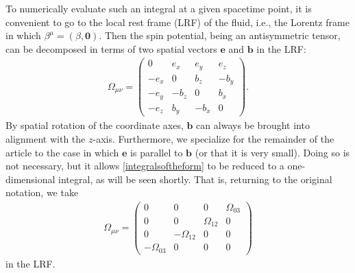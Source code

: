 \documentclass[12pt,aps,prd,nofootinbib,noshowkeys,noshowpacs,longbibliography,
superscriptaddress,tightenlines,floatfix,preprintnumbers]{revtex4-2}
\begin{document}
To numerically evaluate such an integral at a given spacetime point, it is convenient to go to the local rest frame (LRF) of the fluid, i.e., the Lorentz frame in which $\beta^\mu=(\beta, \bm 0)$. Then the spin potential, being an antisymmetric tensor, can be decomposed in terms of two spatial vectors $\bm e$ and $\bm b$ in the LRF:
\begin{align} \label{eandb}
    \Omega_{\mu\nu} = \begin{pmatrix}
    0 & e_x & e_y & e_z \\
    -e_x & 0 & b_z & -b_y \\
    -e_y & - b_z & 0 & b_x \\
    -e_z & b_y & -b_x & 0
    \end{pmatrix}.
\end{align}
By spatial rotation of the coordinate axes, $\bm b$ can always be brought into alignment with the $z$-axis. Furthermore, we specialize for the remainder of the article to the case in which $\bm e$ is parallel to $\bm b$ (or that it is very small). Doing so is not necessary, but it allows \eqref{integralsoftheform} to be reduced to a one-dimensional integral, as will be seen shortly. That is, returning to the original notation, we take
\begin{align}
    \Omega_{\mu\nu} = \begin{pmatrix}
    0 & 0 & 0 & \Omega_{03} \\
    0 & 0 & \Omega_{12} & 0 \\
    0 & - \Omega_{12} & 0 & 0 \\
    -\Omega_{03} & 0 & 0 & 0
    \end{pmatrix}
\end{align}
in the LRF.
\end{document}
